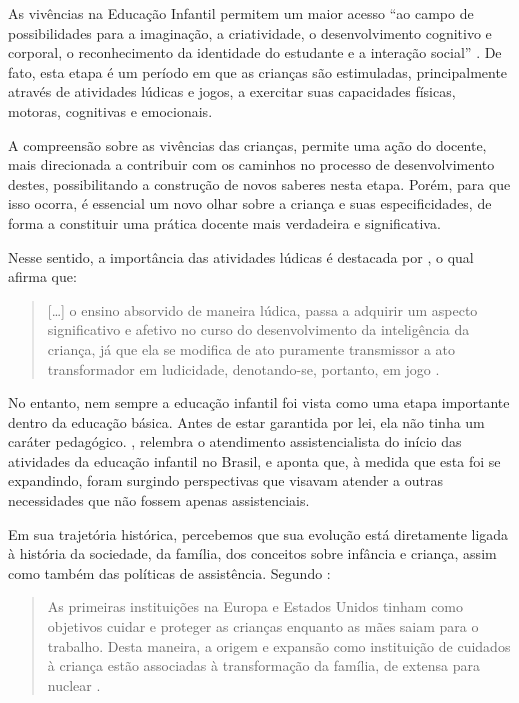 \begin{refsection}
    As vivências na Educação Infantil permitem um maior acesso “ao campo de possibilidades para a imaginação, a criatividade, o desenvolvimento cognitivo e corporal, o reconhecimento da identidade do estudante e a interação social” \cite[p.~128]{CANDA2004Aprender}. De fato, esta etapa é um período em que as crianças são estimuladas, principalmente através de atividades lúdicas e jogos, a exercitar suas capacidades físicas, motoras, cognitivas e emocionais. 

    A compreensão sobre as vivências das crianças, permite uma ação do docente, mais direcionada a contribuir com os caminhos no processo de desenvolvimento destes, possibilitando a construção de novos saberes nesta etapa. Porém, para que isso ocorra, é essencial um novo olhar sobre a criança e suas especificidades, de forma a constituir uma prática docente mais verdadeira e significativa. 

    Nesse sentido, a importância das atividades lúdicas é destacada por \textcite{CARVALHO1992Brincadeira}, o qual afirma que: 

    \begin{quotation}
        [\dots] o ensino absorvido de maneira lúdica, passa a adquirir um aspecto significativo e afetivo no curso do desenvolvimento da inteligência da criança, já que ela se modifica de ato puramente transmissor a ato transformador em ludicidade, denotando-se, portanto, em jogo \cite[p.~28]{CARVALHO1992Brincadeira}. 
    \end{quotation}

    No entanto, nem sempre a educação infantil foi vista como uma etapa importante dentro da educação básica. Antes de estar garantida por lei, ela não tinha um caráter pedagógico. \textcite{BACELAR2009Ludicidade}, relembra o atendimento assistencialista do início das atividades da educação infantil no Brasil, e aponta que, à medida que esta foi se expandindo, foram surgindo perspectivas que visavam atender a outras necessidades que não fossem apenas assistenciais.  

    Em sua trajetória histórica, percebemos que sua evolução está diretamente ligada à história da sociedade, da família, dos conceitos sobre infância e criança, assim como também das políticas de assistência. Segundo \textcite{PASCHOALAndMACHADO2009história}: 

    \begin{quotation}
        As primeiras instituições na Europa e Estados Unidos tinham como objetivos cuidar e proteger as crianças enquanto as mães saiam para o trabalho. Desta maneira, a origem e expansão como instituição de cuidados à criança estão associadas à transformação da família, de extensa para nuclear \cite[p.~78]{PASCHOALAndMACHADO2009história}.
    \end{quotation}


\end{refsection}

